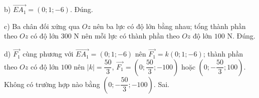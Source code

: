 \begin{ex}
{b) $\overrightarrow{EA_1}=(0;1;-6)$. Đúng.

c) Ba chân đối xứng qua $Oz$ nên ba lực có độ lớn bằng nhau; tổng thành phần theo $Oz$ có độ lớn $300$ N nên mỗi lực có thành phần theo $Oz$ độ lớn $100$ N. Đúng.

d) $\overrightarrow{F_1}$ cùng phương với $\overrightarrow{EA_1}=(0;1;-6)$ nên $\overrightarrow{F_1}=k(0;1;-6)$; thành phần theo $Oz$ có độ lớn $100$ nên $|k|=\dfrac{50}3$, $\overrightarrow{F_1}=\left(0;\dfrac{50}3;-100\right)$ hoặc $\left(0;-\dfrac{50}3;100\right)$. Không có trường hợp nào bằng $\left(0;-\dfrac{50}3;-100\right)$. Sai.}
\end{ex}

